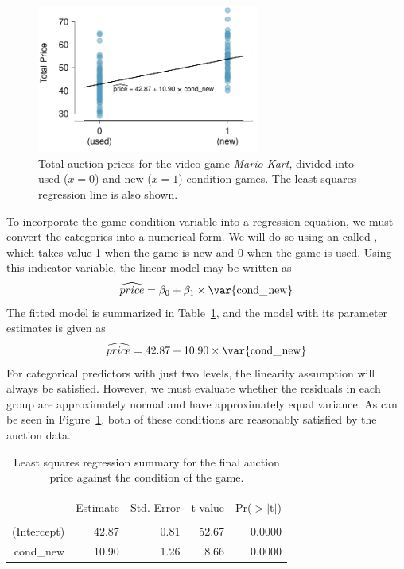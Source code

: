 \begin{figure}
\centering
\includegraphics[width=0.65\textwidth]{ch_regr_simple_linear/figures/marioKartNewUsed/marioKartNewUsed}
\caption{Total auction prices for the video game \emph{Mario Kart}, divided into used ($x=0$) and new ($x=1$) condition games. The least squares regression line is also shown.}
\label{marioKartNewUsed}
\end{figure}

To incorporate the game condition variable into a regression equation, we must convert the categories into a numerical form. We will do so using an  called , which takes value 1 when the game is new and 0 when the game is used. Using this indicator variable, the linear model may be written as
\begin{align*}
\widehat{price} = \beta_0 + \beta_1 \times \text{\var{cond\_\hspace{0.3mm}new}}
\end{align*}
The fitted model is summarized in Table~\ref{marioKartNewUsedRegrSummary}, and the model with its parameter estimates is given as
\begin{align*}
\widehat{price} = 42.87 + 10.90 \times \text{\var{cond\_\hspace{0.3mm}new}}
\end{align*}
For categorical predictors with just two levels, the linearity assumption will always be satisfied. However, we must evaluate whether the residuals in each group are approximately normal and have approximately equal variance. As can be seen in Figure~\ref{marioKartNewUsed}, both of these conditions are reasonably satisfied by the auction data.

\begin{table}
\centering
\begin{tabular}{rrrrr}
  \hline
  \vspace{-3.7mm} & & & & \\
 & Estimate & Std. Error & t value & Pr($>$$|$t$|$) \\ 
  \hline
  \vspace{-3.6mm} & & & & \\
(Intercept) & 42.87 & 0.81 & 52.67 & 0.0000 \\ 
  cond\_\hspace{0.3mm}new & 10.90 & 1.26 & 8.66 & 0.0000 \\ 
   \hline
\end{tabular}
\caption{Least squares regression summary for the final auction price against the condition of the game.}
\label{marioKartNewUsedRegrSummary}
\end{table}

